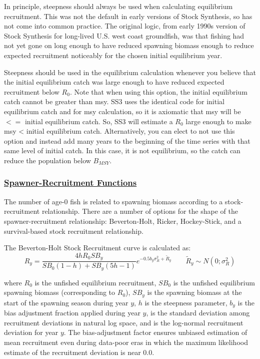 \hypertarget{EquilRecr}{}
In principle, steepness should always be used when calculating equilibrium recruitment. This was not the default in early versions of Stock Synthesis, so has not come into common practice. The original logic, from early 1990s version of Stock Synthesis for long-lived U.S. west coast groundfish, was that fishing had not yet gone on long enough to have reduced spawning biomass enough to reduce expected recruitment noticeably for the chosen initial equilibrium year.

Steepness should be used in the equilibrium calculation whenever you believe that the initial equilibrium catch was large enough to have reduced expected recruitment below $R_{0}$. Note that when using this option, the initial equilibrium catch cannot be greater than \gls{msy}. SS3 uses the identical code for initial equilibrium catch and for \gls{msy} calculation, so it is axiomatic that \gls{msy} will be $<=$ initial equilibrium catch. So, SS3 will estimate a $R_{0}$ large enough to make \gls{msy} < initial equilibrium catch. Alternatively, you can elect to not use this option and instead add many years to the beginning of the time series with that same level of initial catch. In this case, it is not equilibrium, so the catch can reduce the population below $B_{MSY}$.

\hypertarget{SRRFunc}{}
\subsubsection[Spawner-Recruitment Functions]{\protect\hyperlink{SRRFunc}{Spawner-Recruitment Functions}}
The number of age-0 fish is related to spawning biomass according to a stock-recruitment relationship. There are a number of options for the shape of the spawner-recruitment relationship: Beverton-Holt, Ricker, Hockey-Stick, and a survival-based stock recruitment relationship.

\hypertarget{BH}{}
The Beverton-Holt Stock Recruitment curve is calculated as:
\begin{equation}{R_y = \frac{4hR_0SB_y}{SB_0(1-h)+SB_y(5h-1)}e^{-0.5b_y\sigma^2_R+\tilde{R}_y}\qquad  \tilde{R}_y\sim N(0;\sigma^2_R)}
\end{equation}

where $R_0$ is the unfished equilibrium recruitment, $SB_0$ is the unfished equilibrium spawning biomass (corresponding to $R_0$), $SB_y$ is the spawning biomass at the start of the spawning season during year $y$, $h$ is the steepness parameter, $b_y$ is the bias adjustment fraction applied during year $y$, is the standard deviation among recruitment deviations in natural log space, and is the log-normal recruitment deviation for year $y$. The bias-adjustment factor \citep{methot-adjusting-2011} ensures unbiased estimation of mean recruitment even during data-poor eras in which the maximum likelihood estimate of the recruitment deviation is near 0.0.

